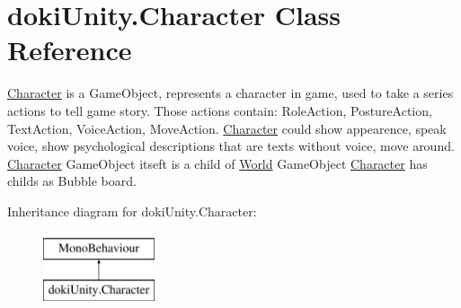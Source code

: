 \hypertarget{classdoki_unity_1_1_character}{}\section{doki\+Unity.\+Character Class Reference}
\label{classdoki_unity_1_1_character}


\hyperlink{classdoki_unity_1_1_character}{Character} is a Game\+Object, represents a character in game, used to take a series actions to tell game story. Those actions contain\+: Role\+Action, Posture\+Action, Text\+Action, Voice\+Action, Move\+Action. \hyperlink{classdoki_unity_1_1_character}{Character} could show appearence, speak voice, show psychological descriptions that are texts without voice, move around. \hyperlink{classdoki_unity_1_1_character}{Character} Game\+Object itseft is a child of \hyperlink{classdoki_unity_1_1_world}{World} Game\+Object \hyperlink{classdoki_unity_1_1_character}{Character} has childs as Bubble board.  


Inheritance diagram for doki\+Unity.\+Character\+:\begin{figure}[H]
\begin{center}
\leavevmode
\includegraphics[height=2.000000cm]{classdoki_unity_1_1_character}
\end{center}
\end{figure}
